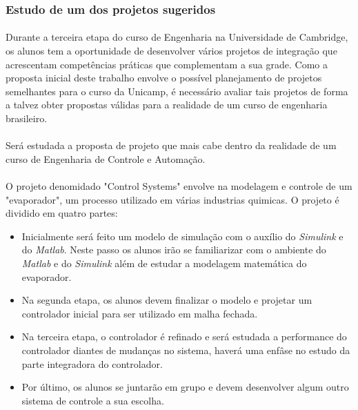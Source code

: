 \documentclass[12pt]{article} %
\begin{document}
\subsubsection{Estudo de um dos projetos sugeridos}

\paragraph{} Durante a terceira etapa do curso de Engenharia na Universidade de Cambridge, os alunos tem a oportunidade de desenvolver vários projetos de integração que acrescentam competências práticas que complementam a sua grade. Como a proposta inicial deste trabalho envolve o possível planejamento de projetos semelhantes para o curso da Unicamp, é necessário avaliar tais projetos de forma a talvez obter propostas válidas para a realidade de um curso de engenharia brasileiro.

\paragraph{} Será estudada a proposta de projeto que mais cabe dentro da realidade de um curso de Engenharia de Controle e Automação.

\paragraph{} O projeto denomidado "Control Systems" envolve na modelagem e controle de um "evaporador", um processo utilizado em várias industrias quimicas. O projeto é dividido em quatro partes:

\begin{itemize}
\item Inicialmente será feito um modelo de simulação com o auxílio do \textit{Simulink} e do \textit{Matlab}. Neste passo os alunos irão se familiarizar com o ambiente do \textit{Matlab} e do \textit{Simulink} além de estudar a modelagem matemática do evaporador.
\item Na segunda etapa, os alunos devem finalizar o modelo e projetar um controlador inicial para ser utilizado em malha fechada.
\item Na terceira etapa, o controlador é refinado e será estudada a performance do controlador diantes de mudanças no sistema, haverá uma enfâse no estudo da parte integradora do controlador.
\item Por último, os alunos se juntarão em grupo e devem desenvolver algum outro sistema de controle a sua escolha.
\end{itemize}
\end{document}
